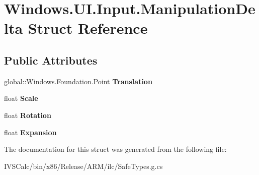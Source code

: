 \hypertarget{struct_windows_1_1_u_i_1_1_input_1_1_manipulation_delta}{}\section{Windows.\+U\+I.\+Input.\+Manipulation\+Delta Struct Reference}
\label{struct_windows_1_1_u_i_1_1_input_1_1_manipulation_delta}
\subsection*{Public Attributes}
\begin{DoxyCompactItemize}
\item 
\mbox{\label{struct_windows_1_1_u_i_1_1_input_1_1_manipulation_delta_ab8c2439bb980dec4e90247aabcbd7faa}} 
global\+::\+Windows.\+Foundation.\+Point {\bfseries Translation}
\item 
\mbox{\label{struct_windows_1_1_u_i_1_1_input_1_1_manipulation_delta_a9370ddc75bb7c73f78016805bd2c58bb}} 
float {\bfseries Scale}
\item 
\mbox{\label{struct_windows_1_1_u_i_1_1_input_1_1_manipulation_delta_a89cf367a1de8d850e3bb1f64db418528}} 
float {\bfseries Rotation}
\item 
\mbox{\label{struct_windows_1_1_u_i_1_1_input_1_1_manipulation_delta_ae4cd1d95aebcd52ae044aa6130135f33}} 
float {\bfseries Expansion}
\end{DoxyCompactItemize}


The documentation for this struct was generated from the following file\+:\begin{DoxyCompactItemize}
\item 
I\+V\+S\+Calc/bin/x86/\+Release/\+A\+R\+M/ilc/Safe\+Types.\+g.\+cs\end{DoxyCompactItemize}
